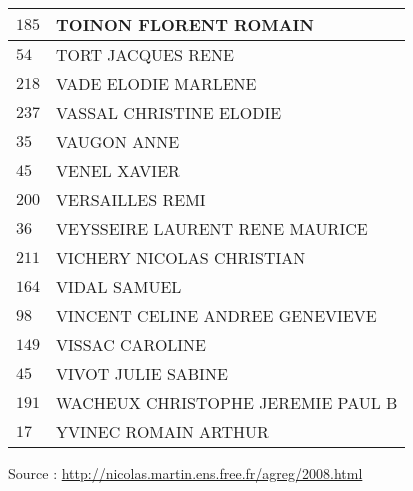 \begin{xltabular}{\linewidth}{|l|X|}
    $185$ & TOINON FLORENT ROMAIN \\
    \hline
    $54$ & TORT JACQUES RENE \\
    \hline
    $218$ & VADE ELODIE MARLENE \\
    \hline
    $237$ & VASSAL CHRISTINE ELODIE \\
    \hline
    $35$ & VAUGON ANNE \\
    \hline
    $45$ & VENEL XAVIER \\
    \hline
    $200$ & VERSAILLES REMI \\
    \hline
    $36$ & VEYSSEIRE LAURENT RENE MAURICE \\
    \hline
    $211$ & VICHERY NICOLAS CHRISTIAN \\
    \hline
    $164$ & VIDAL SAMUEL \\
    \hline
    $98$ & VINCENT CELINE ANDREE GENEVIEVE \\
    \hline
    $149$ & VISSAC CAROLINE \\
    \hline
    $45$ & VIVOT JULIE SABINE \\
    \hline
    $191$ & WACHEUX CHRISTOPHE JEREMIE PAUL B \\
    \hline
    $17$ & YVINEC ROMAIN ARTHUR \\
    \hline
  \end{xltabular}

  \begin{flushright}
    {\tiny Source : \url{http://nicolas.martin.ens.free.fr/agreg/2008.html}}
  \end{flushright}

